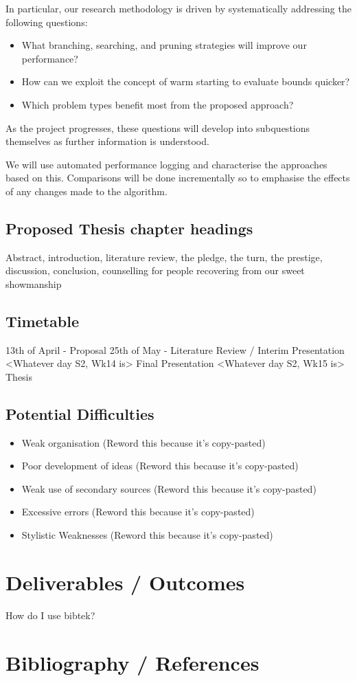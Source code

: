 \documentclass[12pt, a4paper]{article}
\begin{document}
In particular, our research methodology is driven by systematically addressing the following questions:

\begin{itemize}
\item What branching, searching, and pruning strategies will improve our performance?
\item How can we exploit the concept of warm starting to evaluate bounds quicker?
\item Which problem types benefit most from the proposed approach?
\end{itemize}

As the project progresses, these questions will develop into subquestions themselves as further information is understood.

We will use automated performance logging and characterise the approaches based on this. Comparisons will be done incrementally so to emphasise the effects of any changes made to the algorithm.

\subsection{Proposed Thesis chapter headings}
Abstract, introduction, literature review, the pledge, the turn, the prestige, discussion, conclusion, counselling for people recovering from our sweet showmanship
\subsection{Timetable}

13th of April - Proposal
25th of May - Literature Review / Interim Presentation
<Whatever day S2, Wk14 is> Final Presentation
<Whatever day S2, Wk15 is> Thesis

\subsection{Potential Difficulties}
\begin{itemize}
  \item Weak organisation (Reword this because it's copy-pasted)
  \item Poor development of ideas (Reword this because it's copy-pasted)
  \item Weak use of secondary sources (Reword this because it's copy-pasted)
  \item Excessive errors (Reword this because it's copy-pasted)
  \item Stylistic Weaknesses (Reword this because it's copy-pasted)
\end{itemize}

\section{Deliverables / Outcomes}
How do I use bibtek?~\cite{BOOK:1}
\section{Bibliography / References}


\end{document}
